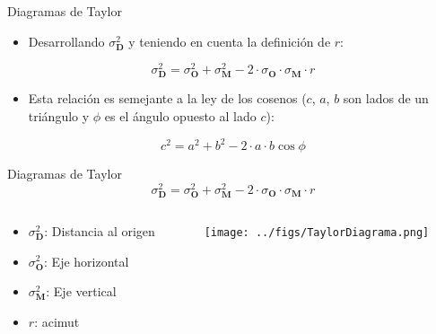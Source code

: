\documentclass[aspectratio=169, usenames,svgnames,dvipsnames]{beamer}
\begin{document}
\begin{frame}[label={sec:org567f99f}]{Diagramas de Taylor}
\begin{itemize}
\item Desarrollando \(\sigma^2_{\mathbf{D}}\) y teniendo en cuenta la definición de \(r\):
\end{itemize}

  \[
  \sigma^2_{\mathbf{D}} = \sigma^2_{\mathbf{O}}  + \sigma^2_{\mathbf{M}}
- 2 \cdot \sigma_{\mathbf{O}} \cdot \sigma_{\mathbf{M}} \cdot r
  \]
\begin{itemize}
\item Esta relación es semejante a la ley de los cosenos (\(c\), \(a\), \(b\) son lados de un triángulo y \(\phi\) es el ángulo opuesto al lado \(c\)):
\end{itemize}

\[
c^2 = a^2 + b^2 - 2 \cdot a \cdot b \cos\phi
\]
\nocite{Taylor2000}
\end{frame}

\begin{frame}[label={sec:orgdf94e2a}]{Diagramas de Taylor}
\[
\sigma^2_{\mathbf{D}} = \sigma^2_{\mathbf{O}}  + \sigma^2_{\mathbf{M}}
- 2 \cdot \sigma_{\mathbf{O}} \cdot \sigma_{\mathbf{M}} \cdot r 
\]

\begin{columns}
\begin{column}{0.4\columnwidth}
\begin{itemize}
\item \(\sigma^2_{\mathbf{D}}\): Distancia al origen
\item \(\sigma^2_{\mathbf{O}}\): Eje horizontal
\item \(\sigma^2_{\mathbf{M}}\): Eje vertical
\item \(r\): acimut
\end{itemize}
\end{column}

\begin{column}{0.7\columnwidth}
\begin{center}
\texttt{[image: ../figs/TaylorDiagrama.png]}
\end{center}
\end{column}
\end{columns}
\end{frame}
\end{document}
